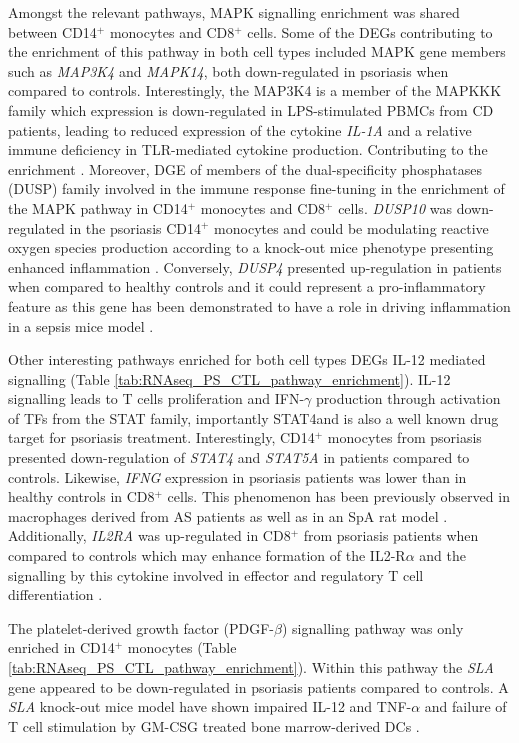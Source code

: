 Amongst the relevant pathways, MAPK signalling enrichment was shared between CD14$^+$ monocytes and CD8$^+$ cells. Some of the DEGs contributing to the enrichment of this pathway in both cell types included MAPK gene members such as \textit{MAP3K4} and \textit{MAPK14}, both down-regulated in psoriasis when compared to controls. Interestingly, the MAP3K4 is a member of the MAPKKK family which expression is down-regulated in LPS-stimulated PBMCs from CD patients, leading to reduced expression of the cytokine \textit{IL-1A} and a relative immune deficiency in TLR-mediated cytokine production. Contributing to the enrichment \parencite{Kraan2012}. Moreover, DGE of members of the dual-specificity phosphatases (DUSP) family involved in the immune response fine-tuning \parencite{Qian2009} in the enrichment of the MAPK pathway in CD14$^+$ monocytes and CD8$^+$ cells. \textit{DUSP10} was down-regulated in the psoriasis CD14$^+$ monocytes and could be modulating reactive oxygen species production according to a knock-out mice phenotype presenting enhanced inflammation \parencite{Qian2009}. Conversely, \textit{DUSP4} presented up-regulation in patients when compared to healthy controls and it could represent a pro-inflammatory feature as this gene has been demonstrated to have a role in driving inflammation in a sepsis mice model \parencite{Cornell2010}.  

Other interesting pathways enriched for both cell types DEGs IL-12 mediated signalling (Table \ref{tab:RNAseq_PS_CTL_pathway_enrichment}). IL-12 signalling leads to T cells proliferation and IFN-$\gamma$ production through activation of TFs from the STAT family, importantly STAT4and is also a well known drug target for psoriasis treatment. Interestingly, CD14$^+$ monocytes from psoriasis presented down-regulation of \textit{STAT4} and \textit{STAT5A} in patients compared to controls. Likewise, \textit{IFNG} expression in psoriasis patients was lower than in healthy controls in CD8$^+$ cells. This phenomenon has been previously observed in macrophages derived from AS patients as well as in an SpA rat model \parencite{Smith2008,Fert2014}. Additionally, \textit{IL2RA} was up-regulated in CD8$^+$ from psoriasis patients when compared to controls which may enhance formation of the IL2-R$\alpha$ and the signalling by this cytokine involved in effector and regulatory T cell differentiation \parencite{Malek2010}.


The platelet-derived growth factor (PDGF-$\beta$) signalling pathway was only enriched in CD14$^+$ monocytes (Table \ref{tab:RNAseq_PS_CTL_pathway_enrichment}). Within this pathway the \textit{SLA} gene appeared to be down-regulated in psoriasis patients compared to controls. A \textit{SLA} knock-out mice model have shown impaired IL-12 and TNF-$\alpha$ and failure of T cell stimulation by GM-CSG treated bone marrow-derived DCs \parencite{Liontos2011}.

